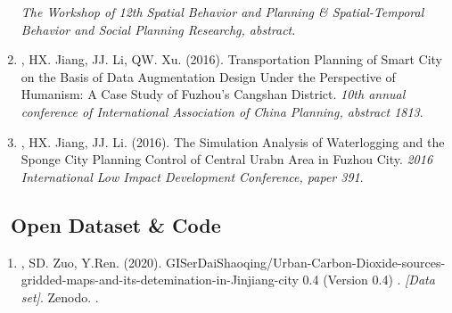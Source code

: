 \begin{enumerate}
    \textit{The Workshop of 12th Spatial Behavior and Planning \& Spatial-Temporal Behavior and Social Planning Researchg, abstract}.
\item
    \Shaoqing, HX. Jiang, JJ. Li, QW. Xu. (2016).
    Transportation Planning of Smart City on the Basis of Data Augmentation Design Under the Perspective of Humanism: A Case Study of Fuzhou's Cangshan District.
    \textit{10th annual conference of International Association of China Planning, abstract 1813}.
\item
   \Shaoqing, HX. Jiang, JJ. Li. (2016).
    The Simulation Analysis of Waterlogging and the Sponge City Planning Control of Central Urabn Area in Fuzhou City.
    \textit{2016 International Low Impact Development Conference, paper 391}.
\end{enumerate}

\subsection*{\texorpdfstring{\faBook\ Open Dataset \& Code}{Open Dataset \& Code}}
\begin{enumerate}
\item
   \Shaoqing, SD. Zuo, Y.Ren. (2020).
    GISerDaiShaoqing/Urban-Carbon-Dioxide-sources-gridded-maps-and-its-detemination-in-Jinjiang-city 0.4 (Version 0.4) .
    \textit{[Data set]}. Zenodo. 
    .
\end{enumerate}

